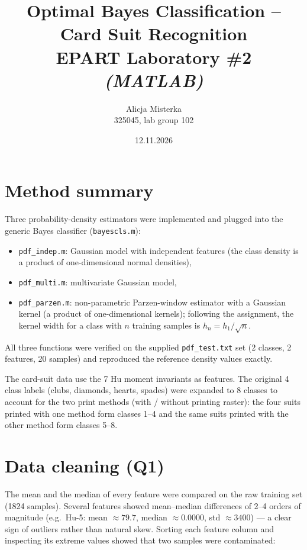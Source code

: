 \documentclass[11pt,a4paper]{article}
\title{\large Optimal Bayes Classification -- Card Suit Recognition\\[4pt]
\normalsize EPART Laboratory \#2 \\ \textit{(MATLAB)}}
\author{Alicja Misterka \\
325045, lab group 102}
\date{12.11.2026}
\begin{document}
\maketitle
\vspace{-2.2em}

\section{Method summary}

Three probability-density estimators were implemented and plugged into the
generic Bayes classifier (\texttt{bayescls.m}):
\begin{itemize}
  \item \texttt{pdf\_indep.m}: Gaussian model with independent features (the
    class density is a product of one-dimensional normal densities),
  \item \texttt{pdf\_multi.m}: multivariate Gaussian model,
  \item \texttt{pdf\_parzen.m}: non-parametric Parzen-window estimator with a
    Gaussian kernel (a product of one-dimensional kernels); following the
    assignment, the kernel width for a class with $n$ training samples is
    $h_n = h_1/\sqrt{n}$.
\end{itemize}
All three functions were verified on the supplied \texttt{pdf\_test.txt} set
(2 classes, 2 features, 20 samples) and reproduced the reference density values
exactly.

The card-suit data use the 7 Hu moment invariants as features. The original
4 class labels (clubs, diamonds, hearts, spades) were expanded to 8 classes to
account for the two print methods (with / without printing raster): the four
suits printed with one method form classes 1--4 and the same suits printed
with the other method form classes 5--8.

\section{Data cleaning (Q1)}

The mean and the median of every feature were compared on the raw training set
(1824 samples). Several features showed mean--median differences of 2--4
orders of magnitude (e.g.\ Hu-5: mean $\approx 79.7$, median $\approx 0.0000$,
std $\approx 3400$) --- a clear sign of outliers rather than natural skew.
Sorting each feature column and inspecting its extreme values showed that two
samples were contaminated:
\end{document}
